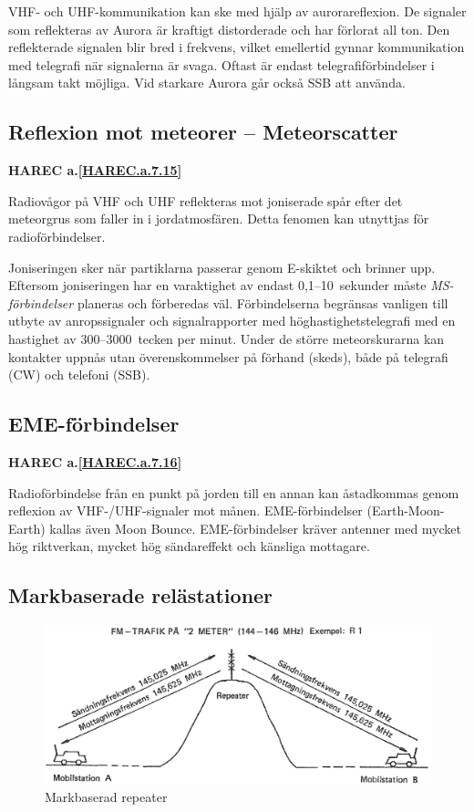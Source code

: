 VHF- och UHF-kommunikation kan ske med hjälp av aurorareflexion. De
signaler som reflekteras av Aurora är kraftigt distorderade och har
förlorat all ton. Den reflekterade signalen blir bred i frekvens,
vilket emellertid gynnar kommunikation med telegrafi när signalerna är
svaga. Oftast är endast telegrafiförbindelser i långsam takt möjliga.
Vid starkare Aurora går också SSB att använda.

\subsection{Reflexion mot meteorer -- Meteorscatter}
\textbf{
HAREC a.\ref{HAREC.a.7.15}\label{myHAREC.a.7.15}
}

Radiovågor på VHF och UHF reflekteras mot joniserade spår efter det
meteorgrus som faller in i jordatmosfären. Detta fenomen kan utnyttjas
för radioförbindelser.

Joniseringen sker när partiklarna passerar genom E-skiktet och brinner upp.
Eftersom joniseringen har en varaktighet av endast 0,1--10~sekunder måste
\emph{MS-förbindelser} planeras och förberedas väl.
Förbindelserna begränsas vanligen till utbyte av anropssignaler och
signalrapporter med höghastighetstelegrafi med en hastighet av
300--3000~tecken per minut.
Under de större meteorskurarna kan kontakter uppnås utan överenskommelser på
förhand (skeds), både på telegrafi (CW) och telefoni (SSB).

\subsection{EME-förbindelser}
\textbf{
HAREC a.\ref{HAREC.a.7.16}\label{myHAREC.a.7.16}
}

Radioförbindelse från en punkt på jorden till en annan kan åstadkommas
genom reflexion av VHF-/UHF-signaler mot månen. EME-förbindelser
(Earth-Moon-Earth) kallas även Moon Bounce. EME-förbindelser kräver
antenner med mycket hög riktverkan, mycket hög sändareffekt och
känsliga mottagare.

\subsection{Markbaserade relästationer}

\begin{figure}
  \includegraphics[width=\textwidth]{images/cropped_pdfs/bild_2_7-12.pdf}
  \caption{Markbaserad repeater}
  \label{fig:bildII7-12}
\end{figure}


